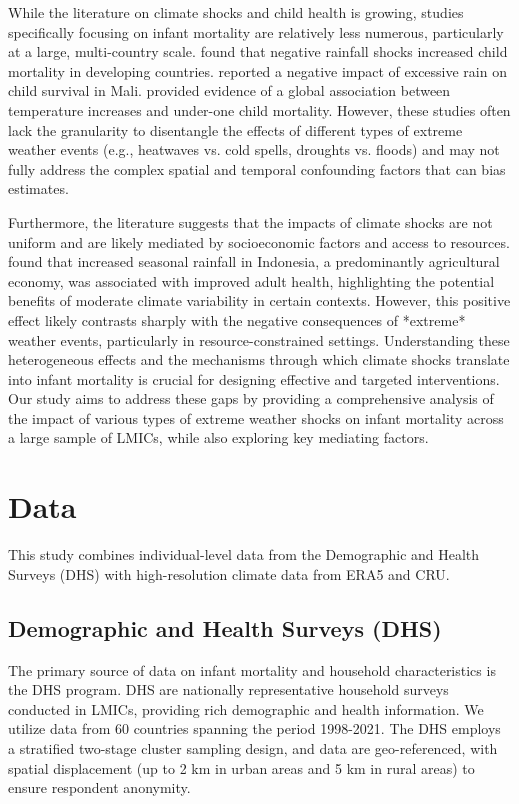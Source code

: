 \documentclass[12pt]{article}
\begin{document}
While the literature on climate shocks and child health is growing, studies specifically focusing on infant mortality are relatively less numerous, particularly at a large, multi-country scale.  \cite{ponnusamy2022} found that negative rainfall shocks increased child mortality in developing countries. \cite{han2013} reported a negative impact of excessive rain on child survival in Mali.  \cite{meierrieks2021} provided evidence of a global association between temperature increases and under-one child mortality.  However, these studies often lack the granularity to disentangle the effects of different types of extreme weather events (e.g., heatwaves vs. cold spells, droughts vs. floods) and may not fully address the complex spatial and temporal confounding factors that can bias estimates.

Furthermore, the literature suggests that the impacts of climate shocks are not uniform and are likely mediated by socioeconomic factors and access to resources.  \cite{maccini2009} found that increased seasonal rainfall in Indonesia, a predominantly agricultural economy, was associated with improved adult health, highlighting the potential benefits of moderate climate variability in certain contexts.  However, this positive effect likely contrasts sharply with the negative consequences of *extreme* weather events, particularly in resource-constrained settings.  Understanding these heterogeneous effects and the mechanisms through which climate shocks translate into infant mortality is crucial for designing effective and targeted interventions.  Our study aims to address these gaps by providing a comprehensive analysis of the impact of various types of extreme weather shocks on infant mortality across a large sample of LMICs, while also exploring key mediating factors.

\section{Data} \label{sec:data}

This study combines individual-level data from the Demographic and Health Surveys (DHS) with high-resolution climate data from ERA5 and CRU.

\subsection{Demographic and Health Surveys (DHS)}

The primary source of data on infant mortality and household characteristics is the DHS program.  DHS are nationally representative household surveys conducted in LMICs, providing rich demographic and health information. We utilize data from 60 countries spanning the period 1998-2021. The DHS employs a stratified two-stage cluster sampling design, and data are geo-referenced, with spatial displacement (up to 2 km in urban areas and 5 km in rural areas) to ensure respondent anonymity.
\end{document}
